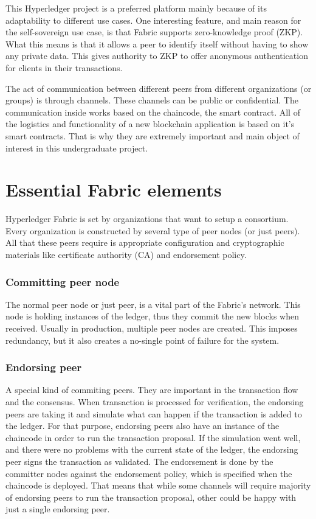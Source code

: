 \documentclass[a4paper,11pt]{report}
\begin{document}
	This Hyperledger project is a preferred platform mainly because of its adaptability to different use cases. One interesting feature, and main reason for the self-sovereign use case, is that Fabric supports zero-knowledge proof (ZKP). What this means is that it allows a peer to identify itself without having to show any private data. This gives authority to ZKP to offer anonymous authentication for clients in their transactions. \cite{li2018fppb}
	
	The act of communication between different peers from different organizations (or groups) is through channels. These channels can be public or confidential. The communication inside works based on the chaincode, the smart contract. All of the logistics and functionality of a new blockchain application is based on it’s smart contracts. That is why they are extremely important and main object of interest in this undergraduate project.
	
	
\section{Essential Fabric elements}
\label{felements}
Hyperledger Fabric is set by organizations that want to setup a consortium. Every organization is constructed by several type of peer nodes (or just peers). All that these peers require is appropriate configuration and cryptographic materials like certificate authority (CA) and endorsement policy.
\subsubsection{Committing peer node}
The normal peer node or just peer, is a vital part of the Fabric’s network. This node is holding instances of the ledger, thus they commit the new blocks when received. Usually in production, multiple peer nodes are created. This imposes redundancy, but it also creates a no-single point of failure for the system. 
\subsubsection{Endorsing peer}
A special kind of commiting peers. They are important in the transaction flow and the consensus. When transaction is processed for verification, the endorsing peers are taking it and simulate what can happen if the transaction is added to the ledger. For that purpose, endorsing peers also have an instance of the chaincode in order to run the transaction proposal. If the simulation went well, and there were no problems with the current state of the ledger, the endorsing peer signs the transaction as validated. The endorsement is done by the committer nodes against the endorsement policy, which is specified when the chaincode is deployed. That means that while some channels will require majority of endorsing peers to run the transaction proposal, other could be happy with just a single endorsing peer.
\end{document}

